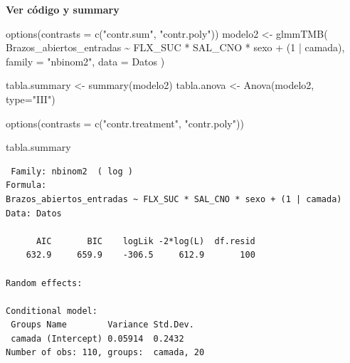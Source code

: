 \documentclass[
  letterpaper,
  DIV=11,
  numbers=noendperiod]{scrartcl}
\newenvironment{Shaded}{\begin{snugshade}}{\end{snugshade}}
\newcommand{\AttributeTok}[1]{\textcolor[rgb]{0.40,0.45,0.13}{#1}}
\newcommand{\DecValTok}[1]{\textcolor[rgb]{0.68,0.00,0.00}{#1}}
\newcommand{\FunctionTok}[1]{\textcolor[rgb]{0.28,0.35,0.67}{#1}}
\newcommand{\NormalTok}[1]{\textcolor[rgb]{0.00,0.23,0.31}{#1}}
\newcommand{\OtherTok}[1]{\textcolor[rgb]{0.00,0.23,0.31}{#1}}
\newcommand{\SpecialCharTok}[1]{\textcolor[rgb]{0.37,0.37,0.37}{#1}}
\newcommand{\StringTok}[1]{\textcolor[rgb]{0.13,0.47,0.30}{#1}}
\begin{document}
\begin{tcolorbox}[enhanced jigsaw, arc=.35mm, bottomrule=.15mm, breakable, colback=white, colframe=quarto-callout-note-color-frame, left=2mm, leftrule=.75mm, opacityback=0, rightrule=.15mm, toprule=.15mm]
\begin{minipage}[t]{5.5mm}
\textcolor{quarto-callout-note-color}{\faInfo}
\end{minipage}%
\begin{minipage}[t]{\textwidth - 5.5mm}

\vspace{-3mm}\textbf{Ver código y summary}\vspace{3mm}

\begin{Shaded}
\begin{Highlighting}[]
\FunctionTok{options}\NormalTok{(}\AttributeTok{contrasts =} \FunctionTok{c}\NormalTok{(}\StringTok{"contr.sum"}\NormalTok{, }\StringTok{"contr.poly"}\NormalTok{))}
\NormalTok{modelo2 }\OtherTok{\textless{}{-}} \FunctionTok{glmmTMB}\NormalTok{(}
\NormalTok{  Brazos\_abiertos\_entradas }\SpecialCharTok{\textasciitilde{}}\NormalTok{ FLX\_SUC }\SpecialCharTok{*}\NormalTok{ SAL\_CNO }\SpecialCharTok{*}\NormalTok{ sexo }\SpecialCharTok{+}\NormalTok{ (}\DecValTok{1} \SpecialCharTok{|}\NormalTok{ camada),}
  \AttributeTok{family =} \StringTok{"nbinom2"}\NormalTok{,}
  \AttributeTok{data =}\NormalTok{ Datos}
\NormalTok{)}


\NormalTok{tabla.summary }\OtherTok{\textless{}{-}} \FunctionTok{summary}\NormalTok{(modelo2)}
\NormalTok{tabla.anova }\OtherTok{\textless{}{-}} \FunctionTok{Anova}\NormalTok{(modelo2, }\AttributeTok{type=}\StringTok{"III"}\NormalTok{)}

\FunctionTok{options}\NormalTok{(}\AttributeTok{contrasts =} \FunctionTok{c}\NormalTok{(}\StringTok{"contr.treatment"}\NormalTok{, }\StringTok{"contr.poly"}\NormalTok{))}

\NormalTok{tabla.summary}
\end{Highlighting}
\end{Shaded}

\begin{verbatim}
 Family: nbinom2  ( log )
Formula:          
Brazos_abiertos_entradas ~ FLX_SUC * SAL_CNO * sexo + (1 | camada)
Data: Datos

      AIC       BIC    logLik -2*log(L)  df.resid 
    632.9     659.9    -306.5     612.9       100 

Random effects:

Conditional model:
 Groups Name        Variance Std.Dev.
 camada (Intercept) 0.05914  0.2432  
Number of obs: 110, groups:  camada, 20


\end{verbatim}
\end{minipage}
\end{tcolorbox}
\end{document}
